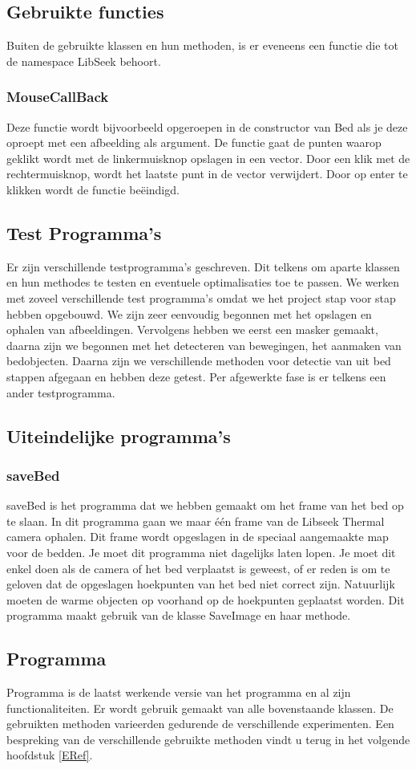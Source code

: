 \subsection{Gebruikte functies}
\label{MRefGFu}
Buiten de gebruikte klassen en hun methoden, is er eveneens een functie die tot de namespace LibSeek behoort.

\subsubsection{MouseCallBack}
Deze functie wordt bijvoorbeeld opgeroepen in de constructor van Bed als je deze oproept met een afbeelding als argument. De functie gaat de punten waarop geklikt wordt met de linkermuisknop opslagen in een vector. Door een klik met de rechtermuisknop, wordt het laatste punt in de vector verwijdert. Door op enter te klikken wordt de functie be\"eindigd. 

\subsection{Test Programma's}
\label{mRefTPr}
Er zijn verschillende testprogramma's geschreven. Dit telkens om aparte klassen en hun methodes te testen en eventuele optimalisaties toe te passen. We werken met zoveel verschillende test programma's omdat we het project stap voor stap hebben opgebouwd. We zijn zeer eenvoudig begonnen met het opslagen en ophalen van afbeeldingen. Vervolgens hebben we eerst een masker gemaakt, daarna zijn we begonnen met het detecteren van bewegingen, het aanmaken van bedobjecten. Daarna zijn we verschillende methoden voor detectie van uit bed stappen afgegaan en hebben deze getest. Per afgewerkte fase is er telkens een ander testprogramma.

\subsection{Uiteindelijke programma's}
\subsubsection{saveBed}
saveBed is het programma dat we hebben gemaakt om het frame van het bed op te slaan. In dit programma gaan we maar \'e\'en frame van de Libseek Thermal camera ophalen. Dit frame wordt opgeslagen in de speciaal aangemaakte map voor de bedden. Je moet dit programma niet dagelijks laten lopen. Je moet dit enkel doen als de camera of het bed verplaatst is geweest, of er reden is om te geloven dat de opgeslagen hoekpunten van het bed niet correct zijn. Natuurlijk moeten de warme objecten op voorhand op de hoekpunten geplaatst worden. Dit programma maakt gebruik van de klasse SaveImage en haar methode.

\subsection{Programma} 
Programma is de laatst werkende versie van het programma en al zijn functionaliteiten. Er wordt gebruik gemaakt van alle bovenstaande klassen. De gebruikten methoden varieerden gedurende de verschillende experimenten. Een bespreking van de verschillende gebruikte methoden vindt u terug in het volgende hoofdstuk \ref{ERef}.
